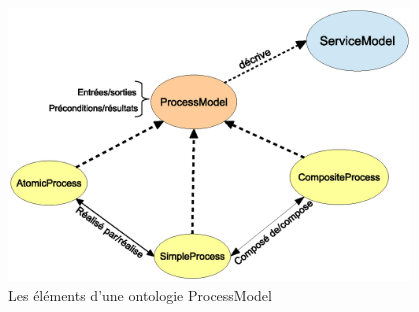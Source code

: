 \begin{figure}[h]
    \centering
    \includegraphics[width=0.95\textwidth]{figs/owls-processModel.eps}
    \caption{Les éléments d'une ontologie ProcessModel}
    \label{fig:owls-processModel}
\end{figure}
